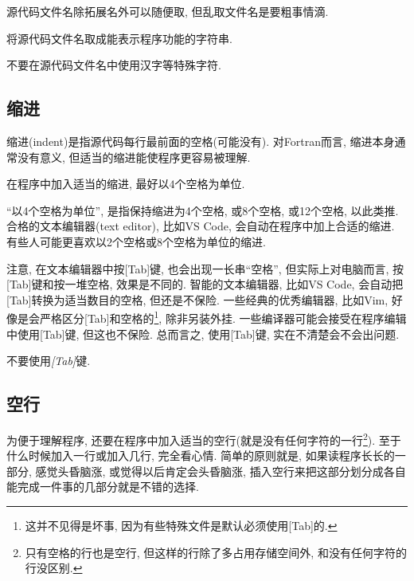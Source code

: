 源代码文件名除拓展名外可以随便取, 但乱取文件名是要粗事情滴.

\begin{convention}
    将源代码文件名取成能表示程序功能的字符串.
\end{convention}

\begin{convention}
    不要在源代码文件名中使用汉字等特殊字符.
\end{convention}

\subsection{缩进}

缩进(indent)是指源代码每行最前面的空格(可能没有). 对Fortran而言, 缩进本身通常没有意义, 但适当的缩进能使程序更容易被理解.

\begin{convention}\label{fortran_indent}
    在程序中加入适当的缩进, 最好以$4$个空格为单位.
\end{convention}

``以4个空格为单位'', 是指保持缩进为4个空格, 或8个空格, 或12个空格, 以此类推. 合格的文本编辑器(text editor), 比如VS Code, 会自动在程序中加上合适的缩进. 有些人可能更喜欢以2个空格或8个空格为单位的缩进.

注意, 在文本编辑器中按[Tab]键, 也会出现一长串``空格'', 但实际上对电脑而言, 按[Tab]键和按一堆空格, 效果是不同的. 智能的文本编辑器, 比如VS Code, 会自动把[Tab]转换为适当数目的空格, 但还是不保险. 一些经典的优秀编辑器, 比如Vim, 好像是会严格区分[Tab]和空格的\footnote{
    这并不见得是坏事, 因为有些特殊文件是默认必须使用[Tab]的.
}, 除非另装外挂. 一些编译器可能会接受在程序编辑中使用[Tab]键, 但这也不保险. 总而言之, 使用[Tab]键, 实在不清楚会不会出问题.

\begin{convention}
    不要使用\emph{[Tab]}键.
\end{convention}

\subsection{空行}

为便于理解程序, 还要在程序中加入适当的空行(就是没有任何字符的一行\footnote{
    只有空格的行也是空行, 但这样的行除了多占用存储空间外, 和没有任何字符的行没区别.
}). 至于什么时候加入一行或加入几行, 完全看心情. 简单的原则就是, 如果读程序长长的一部分, 感觉头昏脑涨, 或觉得以后肯定会头昏脑涨, 插入空行来把这部分划分成各自能完成一件事的几部分就是不错的选择.

